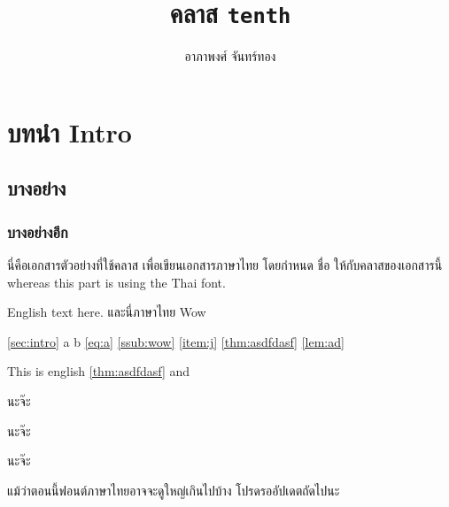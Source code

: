 \usepackage{lipsum}
\title{คลาส \texttt{tenth}}
\author{อาภาพงศ์ จันทร์ทอง}

\newrobustcmd{\codehl}{\texttt}


    \maketitle

    \section{บทนำ Intro \label{sec:intro}}
    \subsection{บางอย่าง}
    \subsubsection{บางอย่างอีก \label{ssub:wow}}

    \makeatletter

    นี่คือเอกสารตัวอย่างที่ใช้คลาส  เพื่อเขียนเอกสารภาษาไทย โดยกำหนด  ชื่อ  ให้กับคลาสของเอกสารนี้  whereas this part is using the Thai font.

    \begin{eng}
        English text here. {\tha และนี่\sffamily ภาษาไทย \eng Wow}
    \end{eng}

    \autoref{sec:intro} a \sectionautorefname{} b \autoref{eq:a} \autoref{ssub:wow} \autoref{item:j}
    \Hfootnoteautorefname{} \AMSautorefname{} \autoref{thm:asdfdasf} \autoref{lem:ad} \lemmaautorefname{}

    { This is english \autoref{thm:asdfdasf} and \chaptername}

    \begin{theorem}
        \label{thm:asdfdasf}
        นะจ๊ะ
    \end{theorem}
    \unskip
    \begin{lemma}
        \label{lem:ad}
        นะจ๊ะ
    \end{lemma}

    \begin{remark}
        นะจ๊ะ
    \end{remark}

    แม้ว่าตอนนี้ฟอนต์ภาษาไทยอาจจะดูใหญ่เกินไปบ้าง โปรดรออัปเดตถัดไปนะ


